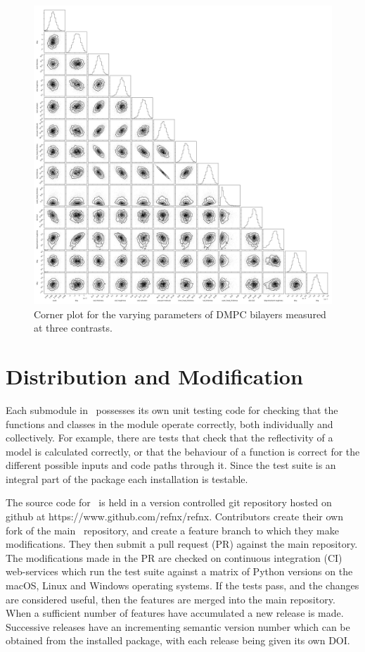 \documentclass[12pt]{article}
\begin{document}
\begin{figure}
  \includegraphics[width=\linewidth]{./supporting_information/corner}
  \caption{Corner plot for the varying parameters of DMPC bilayers measured at three contrasts.}
  \label{fig:corner}
\end{figure}

 
\section*{Distribution and Modification}
Each submodule in \ possesses its own unit testing code for checking that the functions and classes in the module operate correctly, both individually and collectively. For example, there are tests that check that the reflectivity of a model is calculated correctly, or that the behaviour of a function is correct for the different possible inputs and code paths through it. Since the test suite is an integral part of the package each installation is testable.
 
 The source code for \ is held in a version controlled git repository hosted on github at https://www.github.com/refnx/refnx. Contributors create their own fork of the main \ repository, and create a feature branch to which they make modifications. They then submit a pull request (PR) against the main repository. The modifications made in the PR are checked on continuous integration (CI) web-services which run the test suite against a matrix of Python versions on the macOS, Linux and Windows operating systems. If the tests pass, and the changes are considered useful, then the features are merged into the main repository. When a sufficient number of features have accumulated a new release is made. Successive releases have an incrementing semantic version number which can be obtained from the installed package, with each release being given its own DOI.
\end{document}
